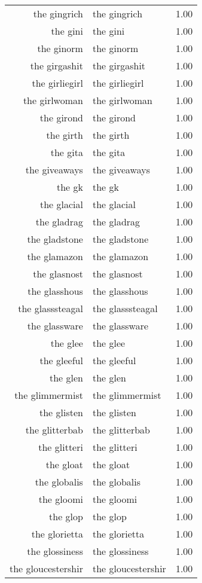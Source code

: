 \begin{table}[ht]
\begin{tabular}{rlr}
  the gingrich & the gingrich & 1.00 \\ 
  the gini & the gini & 1.00 \\ 
  the ginorm & the ginorm & 1.00 \\ 
  the girgashit & the girgashit & 1.00 \\ 
  the girliegirl & the girliegirl & 1.00 \\ 
  the girlwoman & the girlwoman & 1.00 \\ 
  the girond & the girond & 1.00 \\ 
  the girth & the girth & 1.00 \\ 
  the gita & the gita & 1.00 \\ 
  the giveaways & the giveaways & 1.00 \\ 
  the gk & the gk & 1.00 \\ 
  the glacial & the glacial & 1.00 \\ 
  the gladrag & the gladrag & 1.00 \\ 
  the gladstone & the gladstone & 1.00 \\ 
  the glamazon & the glamazon & 1.00 \\ 
  the glasnost & the glasnost & 1.00 \\ 
  the glasshous & the glasshous & 1.00 \\ 
  the glasssteagal & the glasssteagal & 1.00 \\ 
  the glassware & the glassware & 1.00 \\ 
  the glee & the glee & 1.00 \\ 
  the gleeful & the gleeful & 1.00 \\ 
  the glen & the glen & 1.00 \\ 
  the glimmermist & the glimmermist & 1.00 \\ 
  the glisten & the glisten & 1.00 \\ 
  the glitterbab & the glitterbab & 1.00 \\ 
  the glitteri & the glitteri & 1.00 \\ 
  the gloat & the gloat & 1.00 \\ 
  the globalis & the globalis & 1.00 \\ 
  the gloomi & the gloomi & 1.00 \\ 
  the glop & the glop & 1.00 \\ 
  the glorietta & the glorietta & 1.00 \\ 
  the glossiness & the glossiness & 1.00 \\ 
  the gloucestershir & the gloucestershir & 1.00 \\ 

\end{tabular}
\end{table}
